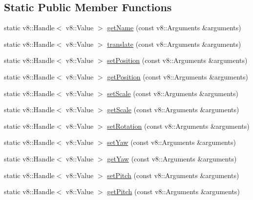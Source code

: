 \subsection*{Static Public Member Functions}
\begin{DoxyCompactItemize}
\item 
static v8\-::\-Handle$<$ v8\-::\-Value $>$ \hyperlink{class_rad_xml_1_1_movable_class_a5001a16caab056722a590b3afdf95a6d}{get\-Name} (const v8\-::\-Arguments \&arguments)
\item 
static v8\-::\-Handle$<$ v8\-::\-Value $>$ \hyperlink{class_rad_xml_1_1_movable_class_a35fe93ec356c7b7d9c9df804a5168f09}{translate} (const v8\-::\-Arguments \&arguments)
\item 
static v8\-::\-Handle$<$ v8\-::\-Value $>$ \hyperlink{class_rad_xml_1_1_movable_class_a537ff5bbc09a47ed95e46861bf7761e1}{set\-Position} (const v8\-::\-Arguments \&arguments)
\item 
static v8\-::\-Handle$<$ v8\-::\-Value $>$ \hyperlink{class_rad_xml_1_1_movable_class_acc5a4a8fa37404ca05faa0394ca812e3}{get\-Position} (const v8\-::\-Arguments \&arguments)
\item 
static v8\-::\-Handle$<$ v8\-::\-Value $>$ \hyperlink{class_rad_xml_1_1_movable_class_ab2b3ea98e86b9b781deae04c9280a752}{set\-Scale} (const v8\-::\-Arguments \&arguments)
\item 
static v8\-::\-Handle$<$ v8\-::\-Value $>$ \hyperlink{class_rad_xml_1_1_movable_class_a9b0d9bfad79b96ceae5177ee04d059c1}{get\-Scale} (const v8\-::\-Arguments \&arguments)
\item 
static v8\-::\-Handle$<$ v8\-::\-Value $>$ \hyperlink{class_rad_xml_1_1_movable_class_a9076cc44ff79f0c0bcd130b6cc83604a}{set\-Rotation} (const v8\-::\-Arguments \&arguments)
\item 
static v8\-::\-Handle$<$ v8\-::\-Value $>$ \hyperlink{class_rad_xml_1_1_movable_class_a7fd6a2934d2979cc65d608c9bc435fa8}{set\-Yaw} (const v8\-::\-Arguments \&arguments)
\item 
static v8\-::\-Handle$<$ v8\-::\-Value $>$ \hyperlink{class_rad_xml_1_1_movable_class_a8333532c5de12597a271648206e4665b}{get\-Yaw} (const v8\-::\-Arguments \&arguments)
\item 
static v8\-::\-Handle$<$ v8\-::\-Value $>$ \hyperlink{class_rad_xml_1_1_movable_class_a5a1cba814458271cebda1b005152361c}{set\-Pitch} (const v8\-::\-Arguments \&arguments)
\item 
static v8\-::\-Handle$<$ v8\-::\-Value $>$ \hyperlink{class_rad_xml_1_1_movable_class_a9e2547776cc92a9b5a6b65e9e59418aa}{get\-Pitch} (const v8\-::\-Arguments \&arguments)

\end{DoxyCompactItemize}
